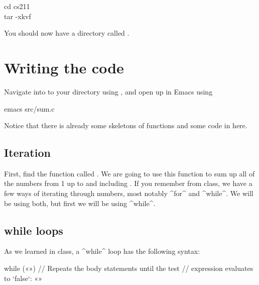 \documentclass{tufte-handout}
\begin{document}
\begin{CmdLine*}
  \C cd cs211\\
  \C tar -xkvf \ThisLabTgz\\
\end{CmdLine*}

\noindent
You should now have a directory called
\filename{\ThisLabBase}.

\section{Writing the code}
Navigate into to your \filename{\ThisLabBase} directory using
, and open up  in Emacs using

\begin{CmdLine*}
  \C emacs src/sum.c\\
\end{CmdLine*}

\noindent
Notice that there is already some skeletons of functions and some code
in  here.

\subsection{Iteration}

First, find the function called
. We are going to use this function to sum up all of the numbers
from 1 up to and including .  If you remember from class, we have a few ways
of iterating through numbers, most notably ^for^ and ^while^.  We will
be using both, but first we will be using ^while^.

\subsection{{\codestyleKeyword while} loops} As we learned in class, a  ^while^
loop has the following syntax:


\begin{Code}
    while («») {
        // Repeats the body statements until the test
        // expression evaluates to `false`:
        «»
    }
\end{Code}
\end{document}
